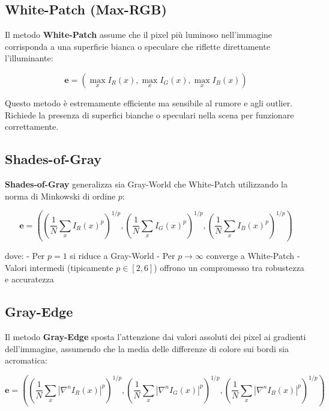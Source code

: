 \subsection{White-Patch (Max-RGB)}

Il metodo \textbf{White-Patch} \cite{zapryanov_automatic_2012} assume che il pixel più luminoso nell'immagine corrisponda a una superficie bianca o speculare che riflette direttamente l'illuminante:

\begin{equation}
\mathbf{e} = \left( \max_x I_R(x), \max_x I_G(x), \max_x I_B(x) \right)
\label{eq:white_patch}
\end{equation}

Questo metodo è estremamente efficiente ma sensibile al rumore e agli outlier. Richiede la presenza di superfici bianche o speculari nella scena per funzionare correttamente.

\subsection{Shades-of-Gray}

\textbf{Shades-of-Gray} \cite{zapryanov_automatic_2012} generalizza sia Gray-World che White-Patch utilizzando la norma di Minkowski di ordine $p$:

\begin{equation}
\mathbf{e} = \left( \left( \frac{1}{N} \sum_{x} I_R(x)^p \right)^{1/p}, \left( \frac{1}{N} \sum_{x} I_G(x)^p \right)^{1/p}, \left( \frac{1}{N} \sum_{x} I_B(x)^p \right)^{1/p} \right)
\label{eq:shades_of_gray}
\end{equation}

dove:
- Per $p = 1$ si riduce a Gray-World
- Per $p \to \infty$ converge a White-Patch
- Valori intermedi (tipicamente $p \in [2, 6]$) offrono un compromesso tra robustezza e accuratezza

\subsection{Gray-Edge}

Il metodo \textbf{Gray-Edge} \cite{van_de_weijer_edge-based_2007} sposta l'attenzione dai valori assoluti dei pixel ai gradienti dell'immagine, assumendo che la media delle differenze di colore sui bordi sia acromatica:

\begin{equation}
\mathbf{e} = \left( \left( \frac{1}{N} \sum_{x} |\nabla^n I_R(x)|^p \right)^{1/p}, \left( \frac{1}{N} \sum_{x} |\nabla^n I_G(x)|^p \right)^{1/p}, \left( \frac{1}{N} \sum_{x} |\nabla^n I_B(x)|^p \right)^{1/p} \right)
\label{eq:gray_edge}
\end{equation}


